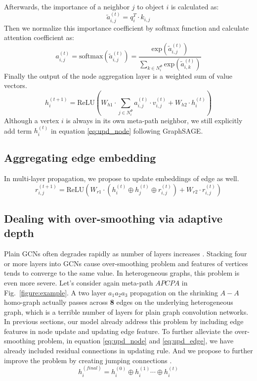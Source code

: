 \noindent Afterwards, the importance of a neighbor $j$ to object $i$ is calculated as:
\begin{equation}
\label{eq:dot}
\tilde{a}^{(t)}_{i,j} = q_i^T \cdot k_{i,j}
\end{equation}
Then we normalize this importance coefficient by softmax function and calculate attention coefficient as:
\begin{equation}
\label{eq:softmax}
a^{(t)}_{i,j} = \text{softmax}(\tilde{a}^{(t)}_{i,j}) = \dfrac{\text{exp}(\tilde{a}^{(t)}_{i,j})}{\sum_{k\in N^\Phi_i}\text{exp}(\tilde{a}^{(t)}_{i,k})}
\end{equation}
Finally the output of the node aggregation layer is a weighted sum of value vectors. 
\begin{equation}
\label{eq:upd_node}
h^{(t+1)}_i = \text{ReLU}( W_{h1}\cdot \sum_{j\in N^\Phi_i} a^{(t)}_{i,j} \cdot v^{(t)}_{i,j} + W_{h2}\cdot h^{(t)}_i) 
\end{equation} 
Although a vertex $i$ is always in its own meta-path neighbor, we still explicitly add term $h^{(t)}_i$ in equation \ref{eq:upd_node} following GraphSAGE\cite{HamiltonYL17}.

\subsection{Aggregating edge embedding}
 In multi-layer propagation, we propose to update embeddings of edge as well.
\begin{equation}
\label{eq:upd_edge}
r^{(t+1)}_{i,j} = \text{ReLU}(W_{r1}\cdot (h^{(t)}_i \oplus h^{(t)}_j \oplus r^{(t)}_{i,j}) + W_{r2}\cdot r^{(t)}_{i,j}) 
\end{equation} 

\subsection{Dealing with over-smoothing via adaptive depth}
Plain GCNs often degrades rapidly as number of layers increases \cite{LiHW18,abs-1904-03751}. Stacking four or more layers into GCNs cause over-smoothing problem and features of vertices tends to converge to the same value. In heterogeneous graphs, this problem is even more severe. Let's consider again meta-path $APCPA$ in Fig.~\ref{figure:example}. A two layer $a_1 a_2 a_3$ propagation on the shrinking $A-A$ homo-graph actually passes across \textbf{8} edges on the underlying heterogeneous graph, which is a terrible number of layers for plain graph convolution networks.
In previous sections, our model already address this problem by including edge features in node update and updating edge feature. To further alleviate the over-smoothing problem, in equation \ref{eq:upd_node} and \ref{eq:upd_edge}, we have already included residual connections \cite{HeZRS16} in updating rule. And we propose to further improve the problem by creating jumping connections \cite{XuLTSKJ18}.
\begin{equation}
\label{eq:jump}
h^{(final)}_i = h^{(0)}_i \oplus h^{(1)}_i \cdots \oplus h^{(t)}_i
\end{equation} 


